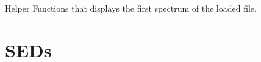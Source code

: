 \documentclass[a4paper,10pt,english]{sphinxmanual}
\begin{document}
\begin{fulllineitems}
\begin{fulllineitems}
\end{fulllineitems}


\begin{fulllineitems}
\label{spectra:astrolyze.spectra.class_.ClassSpectra.quick_view}
Helper Functions that displays the first spectrum of the loaded
file.

\end{fulllineitems}


\end{fulllineitems}



\chapter{SEDs}
\label{sed::doc}\label{sed:seds}
\end{document}
